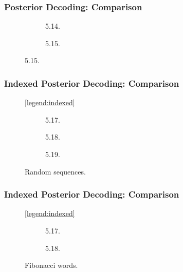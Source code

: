 \documentclass[english,notes]{beamer}
\begin{document}
\begin{frame}
  \frametitle{Posterior Decoding: Comparison}
  \begin{figure}
    \centering
    \begin{subfigure}{0.5\textwidth}
      \centering 
      \caption{5.14.}
    \end{subfigure}\hspace{-5mm}%
    \begin{subfigure}{0.5\textwidth}
      \centering 
      \caption{5.15.}
    \end{subfigure}
  \end{figure}
\end{frame}

\begin{frame}
  \frametitle{Indexed Posterior Decoding: Comparison}
  \begin{figure}
    \centering\ref{legend:indexed}\\
    \begin{subfigure}[t]{0.28\textwidth}
      \centering 
      \caption{5.17.}
    \end{subfigure}\hfill{}%
    \begin{subfigure}[t]{0.28\textwidth}
      \centering 
      \caption{5.18.}
    \end{subfigure}\hfill{}%
    \begin{subfigure}[t]{0.28\textwidth}
      \centering 
      \caption{5.19.}
    \end{subfigure}
    \caption{Random sequences.}
  \end{figure}
\end{frame}

\begin{frame}
  \frametitle{Indexed Posterior Decoding: Comparison}
  \begin{figure}
    \centering\ref{legend:indexed}\\
    \begin{subfigure}[t]{0.5\textwidth}
      \centering 
      \caption{5.17.}
    \end{subfigure}%
    \begin{subfigure}[t]{0.5\textwidth}
      \centering 
      \caption{5.18.}
    \end{subfigure}
    \caption{Fibonacci words.}
  \end{figure}
\end{frame}
\end{document}

